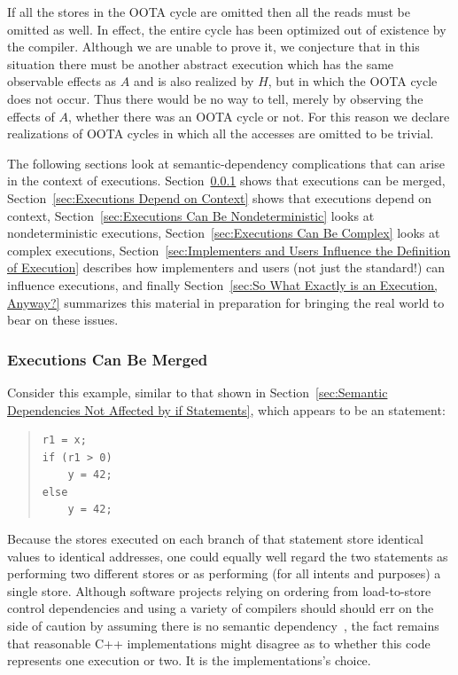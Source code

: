 \documentclass[10]{article}
\begin{document}
If all the stores in the OOTA cycle are omitted then all the reads
must be omitted as well.
In effect, the entire cycle has been optimized
out of existence by the compiler.
Although we are unable to prove it, we conjecture that in this
situation there must be another abstract execution which has the
same observable effects as $A$ and is also realized by $H$, but in
which the OOTA cycle does not occur.
Thus there would be no way to tell, merely by observing the effects of
$A$, whether there was an OOTA cycle or not.
For this reason we declare realizations of OOTA cycles in which
all the accesses are omitted to be trivial.

The following sections look at semantic-dependency complications that
can arise in the context of executions.
Section~\ref{sec:Executions Can Be Merged}
shows that executions can be merged,
Section~\ref{sec:Executions Depend on Context}
shows that executions depend on context,
Section~\ref{sec:Executions Can Be Nondeterministic}
looks at nondeterministic executions,
Section~\ref{sec:Executions Can Be Complex}
looks at complex executions,
Section~\ref{sec:Implementers and Users Influence the Definition of Execution}
describes how implementers and users (not just the standard!) can
influence executions,
and finally
Section~\ref{sec:So What Exactly is an Execution, Anyway?}
summarizes this material in preparation for bringing the real world
to bear on these issues.

\subsubsection{Executions Can Be Merged}
\label{sec:Executions Can Be Merged}

Consider this example, similar to that shown in
Section~\ref{sec:Semantic Dependencies Not Affected by if Statements},
which appears to be an  statement:

\begin{quote}
\begin{verbatim}
r1 = x;
if (r1 > 0)
    y = 42;
else
    y = 42;
\end{verbatim}
\end{quote}

Because the stores executed on each branch of that  statement store
identical values to identical addresses, one could equally well regard
the two statements as performing two different stores or as performing
(for all intents and purposes) a single store.
Although software projects relying on ordering from load-to-store control
dependencies and using a variety of compilers should should err on the
side of caution by assuming there is no semantic
dependency~\cite{Howells2009membartxt},
the fact remains that reasonable C++ implementations might disagree as
to whether this code represents one execution or two.
It is the implementations's choice.
\end{document}
